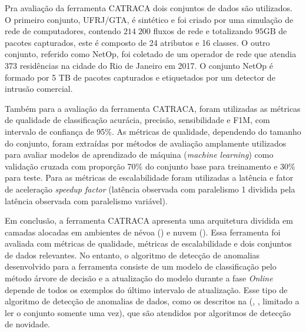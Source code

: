Pra avaliação da ferramenta CATRACA dois conjuntos de dados são utilizados.
O primeiro conjunto, UFRJ/GTA, é sintético e foi criado por uma simulação de
rede de computadores, contendo $214\;200$ fluxos de rede e totalizando $95
\mathrm{GB}$ de pacotes capturados, este \dataset
é composto de 24 atributos e 16 classes.
O outro conjunto, referido como NetOp, foi coletado de um operador de rede que
atendia 373 residências na cidade do Rio de Janeiro em 2017.
O conjunto NetOp é formado por 5 TB de pacotes capturados e etiquetados por um
detector de intrusão comercial.

Também para a avaliação da ferramenta CATRACA, foram utilizadas as métricas de qualidade
de classificação acurácia, precisão, sensibilidade e F1M, com intervalo de
confiança de 95\%.
As métricas de qualidade, dependendo do tamanho do conjunto, foram extraídas por
métodos de avaliação amplamente utilizados para avaliar modelos de aprendizado
de máquina (\emph{machine learning}) como validação cruzada com proporção
70\% do conjunto base para treinamento e 30\% para teste.
Para as métricas de escalabilidade foram utilizadas a latência e fator de aceleração
\emph{speedup factor} (latência observada com paralelismo 1 dividida pela
latência observada com paralelismo variável).

Em conclusão, a ferramenta CATRACA apresenta uma arquitetura dividida em camadas
alocadas em ambientes de névoa (\fog) e nuvem (\cloud).
Essa ferramenta foi avaliada com métricas de qualidade, métricas de
escalabilidade e dois conjuntos de dados relevantes.
No entanto, o algoritmo de detecção de anomalias desenvolvido para a ferramenta
consiste de um modelo de classificação pelo método árvore de decisão e
a atualização do modelo durante a fase \emph{Online} depende de todos os exemplos do
último intervalo de atualização.
Esse tipo de algoritmo de detecção de anomalias 
 de dados, como os
descritos na  (\drift, \evolution, limitado a ler o conjunto somente
uma vez), que são atendidos por algoritmos de detecção de novidade.


